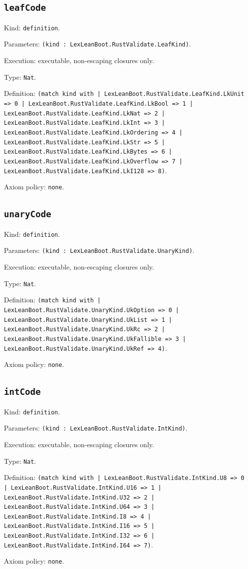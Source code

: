 \documentclass[11pt]{article}
\begin{document}
\subsection*{\texttt{leafCode}}
\noindent Kind: \texttt{definition}.\par
\noindent Parameters: \texttt{(kind : LexLeanBoot.RustValidate.LeafKind)}.\par
\noindent Execution: executable, non-escaping closures only.\par
\noindent Type: \texttt{Nat}.\par
\noindent Definition: \texttt{(match kind with | LexLeanBoot.RustValidate.LeafKind.LkUnit => 0 | LexLeanBoot.RustValidate.LeafKind.LkBool => 1 | LexLeanBoot.RustValidate.LeafKind.LkNat => 2 | LexLeanBoot.RustValidate.LeafKind.LkInt => 3 | LexLeanBoot.RustValidate.LeafKind.LkOrdering => 4 | LexLeanBoot.RustValidate.LeafKind.LkStr => 5 | LexLeanBoot.RustValidate.LeafKind.LkBytes => 6 | LexLeanBoot.RustValidate.LeafKind.LkOverflow => 7 | LexLeanBoot.RustValidate.LeafKind.LkI128 => 8)}.\par
\noindent Axiom policy: \texttt{none}.\par
\subsection*{\texttt{unaryCode}}
\noindent Kind: \texttt{definition}.\par
\noindent Parameters: \texttt{(kind : LexLeanBoot.RustValidate.UnaryKind)}.\par
\noindent Execution: executable, non-escaping closures only.\par
\noindent Type: \texttt{Nat}.\par
\noindent Definition: \texttt{(match kind with | LexLeanBoot.RustValidate.UnaryKind.UkOption => 0 | LexLeanBoot.RustValidate.UnaryKind.UkList => 1 | LexLeanBoot.RustValidate.UnaryKind.UkRc => 2 | LexLeanBoot.RustValidate.UnaryKind.UkFallible => 3 | LexLeanBoot.RustValidate.UnaryKind.UkRef => 4)}.\par
\noindent Axiom policy: \texttt{none}.\par
\subsection*{\texttt{intCode}}
\noindent Kind: \texttt{definition}.\par
\noindent Parameters: \texttt{(kind : LexLeanBoot.RustValidate.IntKind)}.\par
\noindent Execution: executable, non-escaping closures only.\par
\noindent Type: \texttt{Nat}.\par
\noindent Definition: \texttt{(match kind with | LexLeanBoot.RustValidate.IntKind.U8 => 0 | LexLeanBoot.RustValidate.IntKind.U16 => 1 | LexLeanBoot.RustValidate.IntKind.U32 => 2 | LexLeanBoot.RustValidate.IntKind.U64 => 3 | LexLeanBoot.RustValidate.IntKind.I8 => 4 | LexLeanBoot.RustValidate.IntKind.I16 => 5 | LexLeanBoot.RustValidate.IntKind.I32 => 6 | LexLeanBoot.RustValidate.IntKind.I64 => 7)}.\par
\noindent Axiom policy: \texttt{none}.\par
\end{document}
